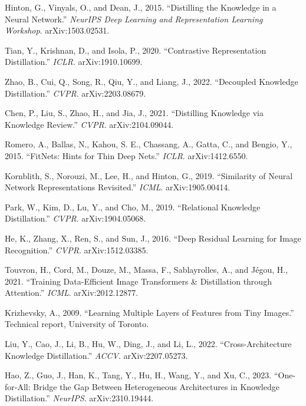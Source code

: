 \documentclass[11pt, letterpaper]{article}
\begin{document}
\begin{enumerate}[label={[\arabic*]},leftmargin=*]
  \item Hinton, G., Vinyals, O., and Dean, J., 2015. ``Distilling the Knowledge in a Neural Network.'' \textit{NeurIPS Deep Learning and Representation Learning Workshop}. arXiv:1503.02531.
  \item Tian, Y., Krishnan, D., and Isola, P., 2020. ``Contrastive Representation Distillation.'' \textit{ICLR}. arXiv:1910.10699.
  \item Zhao, B., Cui, Q., Song, R., Qiu, Y., and Liang, J., 2022. ``Decoupled Knowledge Distillation.'' \textit{CVPR}. arXiv:2203.08679.
  \item Chen, P., Liu, S., Zhao, H., and Jia, J., 2021. ``Distilling Knowledge via Knowledge Review.'' \textit{CVPR}. arXiv:2104.09044.
  \item Romero, A., Ballas, N., Kahou, S. E., Chassang, A., Gatta, C., and Bengio, Y., 2015. ``FitNets: Hints for Thin Deep Nets.'' \textit{ICLR}. arXiv:1412.6550.
  \item Kornblith, S., Norouzi, M., Lee, H., and Hinton, G., 2019. ``Similarity of Neural Network Representations Revisited.'' \textit{ICML}. arXiv:1905.00414.
  \item Park, W., Kim, D., Lu, Y., and Cho, M., 2019. ``Relational Knowledge Distillation.'' \textit{CVPR}. arXiv:1904.05068.
  \item He, K., Zhang, X., Ren, S., and Sun, J., 2016. ``Deep Residual Learning for Image Recognition.'' \textit{CVPR}. arXiv:1512.03385.
  \item Touvron, H., Cord, M., Douze, M., Massa, F., Sablayrolles, A., and J\'egou, H., 2021. ``Training Data-Efficient Image Transformers \& Distillation through Attention.'' \textit{ICML}. arXiv:2012.12877.
  \item Krizhevsky, A., 2009. ``Learning Multiple Layers of Features from Tiny Images.'' Technical report, University of Toronto.
  \item Liu, Y., Cao, J., Li, B., Hu, W., Ding, J., and Li, L., 2022. ``Cross-Architecture Knowledge Distillation.'' \textit{ACCV}. arXiv:2207.05273.
  \item Hao, Z., Guo, J., Han, K., Tang, Y., Hu, H., Wang, Y., and Xu, C., 2023. ``One-for-All: Bridge the Gap Between Heterogeneous Architectures in Knowledge Distillation.'' \textit{NeurIPS}. arXiv:2310.19444.
\end{enumerate}
\end{document}
